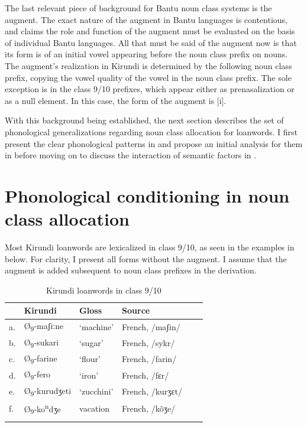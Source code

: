 \documentclass[output=paper,colorlinks,citecolor=brown,
]{langscibook}
\begin{document}
The last relevant piece of background for Bantu noun class systems is the augment. The exact nature of the augment in Bantu languages is contentious, and \citet{Velde2019} claims the role and function of the augment must be evaluated on the basis of individual Bantu languages. All that must be said of the augment now is that its form is of an initial vowel appearing before the noun class prefix on nouns. The augment’s realization in Kirundi is determined by the following noun class prefix, copying the vowel quality of the vowel in the noun class prefix. The sole exception is in the class 9/10 prefixes, which appear either as prenasalization or as a null element. In this case, the form of the augment is [i]. 

With this background being established, the next section describes the set of phonological generalizations regarding noun class allocation for loanwords. I first present the clear phonological patterns in  and propose an initial analysis for them in  before moving on to discuss the interaction of semantic factors in .


\section{Phonological conditioning in noun class allocation} 
\label{sec:kinchsular:phonconditioning}

Most Kirundi loanwords are lexicalized in class 9/10, as seen in the examples in  below. For clarity, I present all forms without the augment. I assume that the augment is added subsequent to noun class prefixes in the derivation. 

\begin{table}
\caption{Kirundi loanwords in class 9/10}
\label{tab:kinchsular:class910}
\begin{tabular}{llllll}
  \lsptoprule
        & {Kirundi} & {Gloss} & {Source} \\
        \midrule
         a. & Ø\textsubscript{9}-maʃiːne & `machine' & French, /maʃin/ \\
         b. & Ø\textsubscript{9}-sukari & `sugar' & French, /sykr/ \\
         c. & Ø\textsubscript{9}-farine & `flour' & French, /farin/ \\
         d. & Ø\textsubscript{9}-fero & `iron' & French, /fɛr/ \\
         e. & Ø\textsubscript{9}-kurudʒeti & `zucchini' & French, /kurʒɛt/ \\
         f. & Ø\textsubscript{9}-ko\textsuperscript{n}dʒe & vacation & French, /k\~{o}ʒe/ \\
  \lspbottomrule
\end{tabular}
\end{table}
\end{document}
